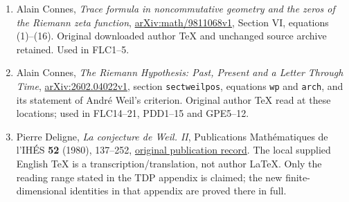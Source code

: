 \documentclass[11pt]{article}
\begin{document}
\begin{enumerate}
{complete ST1--20 proof, pinned edition}. Root downloaded this exact
public file and verified equality with the retained source bytes.
The original objects and metrics are ST1--3; the scalar action is ST4;
the finite bounds are ST6--20. Their human sources are cited in that
proof. FSJ1--13 derives the full-lattice extension of its scalar action.
\item Alain Connes, \emph{Trace formula in noncommutative geometry
and the zeros of the Riemann zeta function},
\href{https://arxiv.org/abs/math/9811068v1}{arXiv:math/9811068v1},
Section VI, equations (1)--(16). Original downloaded author TeX and
unchanged source archive retained. Used in FLC1--5.
\item Alain Connes, \emph{The Riemann Hypothesis: Past, Present and
a Letter Through Time}, \href{https://arxiv.org/abs/2602.04022v1}
{arXiv:2602.04022v1}, section \texttt{sectweilpos}, equations
\texttt{wp} and \texttt{arch}, and its statement of Andr\'e Weil's
criterion. Original author TeX read at these locations; used in
FLC14--21, PDD1--15 and GPE5--12.
\item Pierre Deligne, \emph{La conjecture de Weil. II},
Publications Math\'ematiques de l'IH\'ES \textbf{52} (1980),
137--252, \href{https://www.numdam.org/item/PMIHES_1980__52__137_0/}
{original publication record}. The local supplied English TeX is a
transcription/translation, not author LaTeX. Only the reading range
stated in the TDP appendix is claimed; the new finite-dimensional
identities in that appendix are proved there in full.
\end{enumerate}
\end{document}
